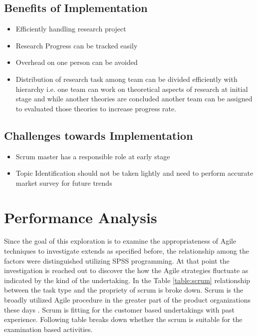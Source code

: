 \subsection{Benefits of Implementation}
\begin{itemize}
	\item Efficiently handling research project
	\item Research Progress can be tracked easily
	\item Overhead on one person can be avoided
	\item Distribution of research task among team can be divided efficiently with hierarchy i.e. one team can work on theoretical aspects of research at initial stage and while another theories are concluded another team can be assigned to evaluated those theories to increase progress rate.
\end{itemize}

\subsection{Challenges towards Implementation}
\begin{itemize}
	\item Scrum master has a responsible role at early stage
	\item Topic Identification should not be taken lightly and need to perform accurate market survey for future trends
\end{itemize}


\section{Performance Analysis}\label{sec:analysis}
Since the goal of this exploration is to examine the appropriateness of Agile techniques to investigate extends as specified before, the relationship among the factors were distinguished utilizing SPSS programming. At that point the investigation is reached out to discover the how the Agile strategies fluctuate as indicated by the kind of the undertaking. In the Table \ref{table:scrum} relationship between the task type and the propriety of scrum is broke down. Scrum is the broadly utilized Agile procedure in the greater part of the product organizations these days \cite{5765710}. Scrum is fitting for the customer based undertakings with past experience. Following table breaks down whether the scrum is suitable for the examination based activities.

